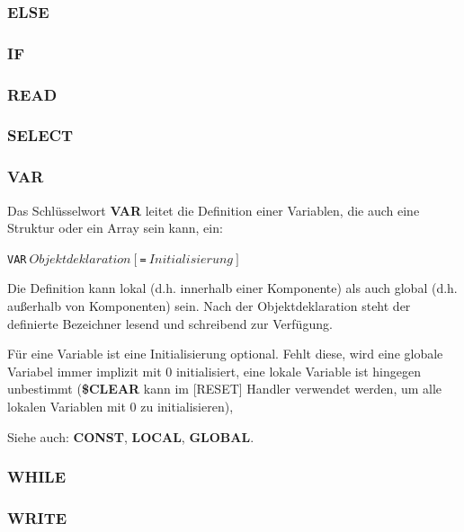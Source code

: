 \documentclass{scrartcl}
\begin{document}
\subsubsection{ELSE}

\subsubsection{IF}

\subsubsection{READ}

\subsubsection{SELECT}

\subsubsection{VAR}

\noindent Das Schlüsselwort \textbf{VAR} leitet die Definition einer Variablen, die auch eine Struktur oder ein Array sein kann, ein:

\vspace{10pt}
\texttt{VAR$~Objektdeklaration~[~$=$~Initialisierung~]$}

\vspace{10pt}
\noindent Die Definition kann lokal (d.h. innerhalb einer Komponente) als auch global (d.h. außerhalb von Komponenten) sein. Nach der Objektdeklaration steht der definierte Bezeichner lesend und schreibend zur Verfügung.


\vspace{10pt}
\noindent Für eine Variable ist eine Initialisierung optional. Fehlt diese, wird eine globale Variabel immer implizit mit 0 initialisiert, eine lokale Variable ist hingegen unbestimmt (\textbf{\$CLEAR} kann im [RESET] Handler verwendet werden, um alle lokalen Variablen mit 0 zu initialisieren),

\vspace{10pt}
\noindent Siehe auch: \textbf{CONST}, \textbf{LOCAL}, \textbf{GLOBAL}.

\subsubsection{WHILE}

\subsubsection{WRITE}
\end{document}
